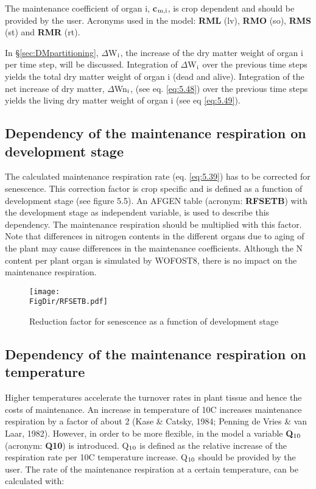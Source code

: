 The maintenance coefficient of organ i, {\bf c$_{{\rm m,i}}$}, is crop dependent and should be provided by
the user. Acronyms used in the model: {\bf RML} (lv), {\bf RMO} (so), {\bf RMS} (st) and {\bf RMR} (rt).

In \S \ref{sec:DMpartitioning}, $\Delta$W$_{{\rm i}}$, the increase of the dry matter weight of 
organ i per time step, will be
discussed. Integration of $\Delta$W$_{{\rm i}}$ over the previous time steps yields the total dry matter
weight of organ i (dead and alive). Integration of the net increase of dry matter, $\Delta$Wn$_{{\rm i}}$,
(see eq. \ref{eq:5.48}) over the previous time steps yields the living dry matter weight of organ i
(see eq \ref{eq:5.49}).

\subsection{Dependency of the maintenance respiration on development stage}
The calculated maintenance respiration rate (eq. \ref{eq:5.39}) has to be corrected for senescence.
This correction factor is crop specific and is defined as a function of development stage
(see figure 5.5). An AFGEN table (acronym: {\bf RFSETB}) with the development stage as
independent variable, is used to describe this dependency. The maintenance respiration
should be multiplied with this factor.  Note that differences in nitrogen contents in the different organs 
due to aging of the plant may cause differences in the maintenance coefficients. Although the 
N content per plant organ is simulated by WOFOST8, there is no impact on the maintenance respiration.

\begin{figure}[htbp]
	\centering
	\texttt{[image: \\FigDir/RFSETB.pdf]}
	\caption{Reduction factor for senescence as a function of development stage}
	\label{fig:RFSETB}
\end{figure}

\subsection{Dependency of the maintenance respiration on temperature}
Higher temperatures accelerate the turnover rates in plant tissue and hence the costs of
maintenance. An increase in temperature of 10\degrees C increases maintenance respiration by a
factor of about 2 (Kase \& Catsky, 1984; Penning de Vries \& van Laar, 1982). However,
in order to be more flexible, in the model a variable {\bf Q$_{{\rm 10}}$} (acronym: {\bf Q10}) is introduced.
Q$_{{\rm 10}}$ is defined as the relative increase of the respiration rate per 10\degrees C temperature
increase. Q$_{{\rm 10}}$ should be provided by the user. The rate of the maintenance respiration at a
certain temperature, can be calculated with:

